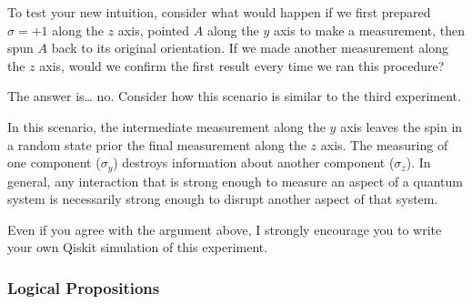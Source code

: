 \documentclass[11pt]{article}
\begin{document}
    To test your new intuition, consider what would happen if we first
prepared \(\sigma = +1\) along the \(z\) axis, pointed \(A\) along the
\(y\) axis to make a measurement, then spun \(A\) back to its original
orientation. If we made another measurement along the \(z\) axis, would
we confirm the first result every time we ran this procedure?

The answer is\ldots{} no. Consider how this scenario is similar to the
third experiment.

In this scenario, the intermediate measurement along the \(y\) axis
leaves the spin in a random state prior the final measurement along the
\(z\) axis. The measuring of one component (\(\sigma_y\)) destroys
information about another component (\(\sigma_z\)). In general, any
interaction that is strong enough to measure an aspect of a quantum
system is necessarily strong enough to disrupt another aspect of that
system.

Even if you agree with the argument above, I strongly encourage you to
write your own Qiskit simulation of this experiment.

    \hypertarget{logical-propositions}{%
\subsubsection{Logical Propositions}\label{logical-propositions}}


    
    
    
    
\end{document}
